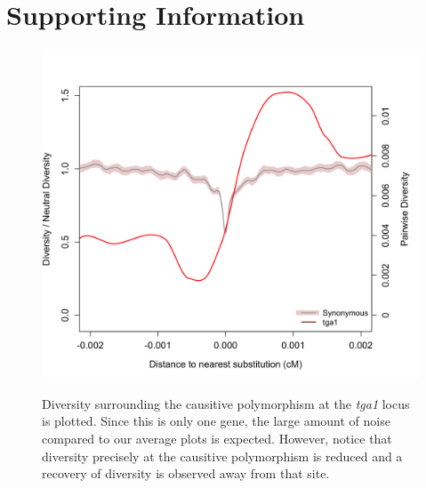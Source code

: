 
\section*{Supporting Information}
\renewcommand\thefigure{S\arabic{figure}}    
\setcounter{figure}{0} 
\begin{figure}[h]
  \begin{center}
    \includegraphics[width=.85\textwidth]{FigsAndFiles/plotDiversity_TvM_Folded2_Significance_tga1Supp_June.png} \\
    \end{center}
\caption{Diversity surrounding the causitive polymorphism at the \emph{tga1} locus is plotted. Since this is only one gene, the large amount of noise compared to our average plots is expected. However, notice that diversity precisely at the causitive polymorphism is reduced and a recovery of diversity is observed away from that site.}
\end{figure}
\clearpage


